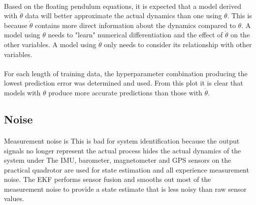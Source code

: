         \paragraph{}
        Based on the floating pendulum equations, it is expected that a model derived with $\dot{\theta}$ data 
        will better approximate the actual dynamics than one using $\theta$.
        This is because $\dot{\theta}$ contains more direct information about the dynamics compared to $\theta$.
        A model using $\theta$ needs to "learn" numerical differentiation and the effect of $\dot{\theta}$ on the other variables.
        A model using $\dot{\theta}$ only needs to consider its relationship with other variables.

        
        \paragraph{}
        For each length of training data, the hyperparameter combination producing the lowest prediction error was determined and used.
        From this plot it is clear that models with $\theta$ produce more accurate predictions than those with $\dot{\theta}$.

    \subsection{Noise}
        \paragraph{}
        Measurement noise is 
        This is bad for system identification because the output signals no longer represent the actual process
        hides the actual dynamics of the system under  
        The IMU, barometer, magnetometer and GPS sensors on the practical quadrotor are used for state estimation 
        and all experience measurement noise.
        The EKF performs sensor fusion and smooths out most of the measurement noise to provide a state estimate that is less noisy than raw sensor values.
        
